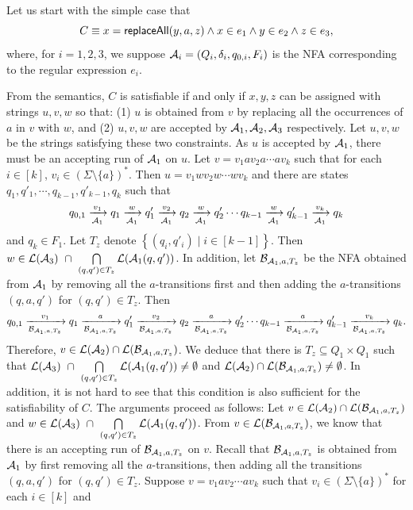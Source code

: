Let us start with the simple case that
\[C \equiv x = \mathsf{replaceAll}(y, a, z) \wedge x \in e_1 \wedge y \in e_2 \wedge z \in e_3,\]
where, for $i =1, 2, 3$, we suppose  $\mathcal{A}_i = (Q_i, \delta_i, q_{0,i}, F_i)$
is the NFA corresponding to the regular expression $e_i$.

From the semantics, $C$ is satisfiable if and only if $x, y, z$ can be assigned with strings $u, v, w$ so that: (1) $u$ is obtained from $v$ by replacing all the occurrences of $a$ in $v$ with $w$, and (2) $u, v, w$ are accepted by $\mathcal{A}_1, \mathcal{A}_2, \mathcal{A}_3$ respectively. Let $u,v,w$ be the strings satisfying these two constraints. As $u$ is accepted by $\mathcal{A}_1$,  there must be an accepting run of $\mathcal{A}_1$ on $u$. Let $v = v_1 a v_2 a \cdots a v_k$ such that for each $i \in [k]$, $v_i \in (\Sigma \setminus \{a\})^*$. Then $u = v_1 w v_2 w \cdots w v_k$ and there are states $q_1, q'_1, \cdots, q_{k-1}, q'_{k-1}, q_k$  such that
%
$$
q_{0,1} \xrightarrow[\mathcal{A}_1]{v_1} q_1 \xrightarrow[\mathcal{A}_1]{w} q'_1 \xrightarrow[\mathcal{A}_1]{v_2} q_2 \xrightarrow[\mathcal{A}_1]{w} q'_2 \cdots q_{k-1} \xrightarrow[\mathcal{A}_1]{w} q'_{k-1} \xrightarrow[\mathcal{A}_1]{v_k} q_k
$$
%
 and $q_k \in F_{1}$. Let $T_z$ denote $\left\{(q_i, q'_i) \mid i \in [k-1] \right\}$. Then $w \in \mathcal{L}(\mathcal{A}_3)\ \cap\ \bigcap \limits_{(q, q') \in T_z} \mathcal{L}(\mathcal{A}_1(q, q'))$. In addition, let  $\mathcal{B}_{\mathcal{A}_1,a,T_z}$ be the NFA obtained from $\mathcal{A}_1$ by removing all the $a$-transitions first and then adding the $a$-transitions $(q, a, q')$ for $(q, q') \in T_z$. Then
$$
q_{0,1} \xrightarrow[\mathcal{B}_{\mathcal{A}_1,a,T_z}]{v_1} q_1 \xrightarrow[\mathcal{B}_{\mathcal{A}_1,a,T_z}]{a} q'_1 \xrightarrow[\mathcal{B}_{\mathcal{A}_1,a,T_z}]{v_2} q_2 \xrightarrow[\mathcal{B}_{\mathcal{A}_1,a,T_z}]{a} q'_2 \cdots q_{k-1} \xrightarrow[\mathcal{B}_{\mathcal{A}_1,a,T_z}]{a} q'_{k-1} \xrightarrow[\mathcal{B}_{\mathcal{A}_1,a,T_z}]{v_k} q_k.
$$
%
Therefore,
$v \in \mathcal{L}(\mathcal{A}_2) \cap \mathcal{L}(\mathcal{B}_{\mathcal{A}_1,a,T_z})$. We deduce that there is $T_z \subseteq Q_1 \times Q_1$ such that $\mathcal{L}(\mathcal{A}_3)\ \cap\ \bigcap \limits_{(q, q') \in T_z} \mathcal{L}(\mathcal{A}_1(q, q')) \neq \emptyset$ and $ \mathcal{L}(\mathcal{A}_2) \cap \mathcal{L}(\mathcal{B}_{\mathcal{A}_1,a,T_z}) \neq \emptyset$. In addition, it is not hard to see that this condition is also sufficient for the satisfiability of $C$. The arguments proceed as follows: Let $v \in  \mathcal{L}(\mathcal{A}_2) \cap \mathcal{L}(\mathcal{B}_{\mathcal{A}_1,a,T_z})$ and $w \in \mathcal{L}(\mathcal{A}_3)\ \cap\ \bigcap \limits_{(q, q') \in T_z} \mathcal{L}(\mathcal{A}_1(q, q'))$. From $v \in \mathcal{L}(\mathcal{B}_{\mathcal{A}_1,a,T_z})$, we know that there is an accepting run of $\mathcal{B}_{\mathcal{A}_1,a,T_z}$ on $v$. Recall that $\mathcal{B}_{\mathcal{A}_1,a,T_z}$ is obtained from $\mathcal{A}_1$ by first removing all the $a$-transitions, then adding all the transitions $(q,a,q')$ for $(q,q') \in T_z$.  Suppose $v = v_1 a v_2 \cdots a v_k$ such that $v_i \in (\Sigma \setminus \{a\})^*$ for each $i \in [k]$ and
